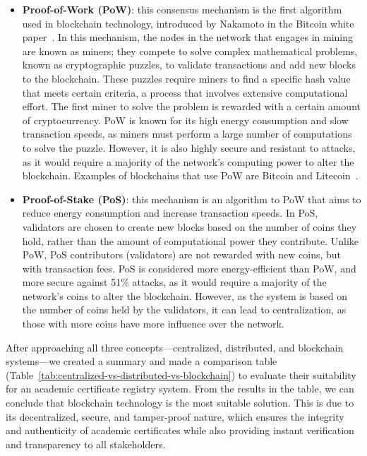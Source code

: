 \begin{itemize}
    \item \textbf{Proof-of-Work (PoW)}: this consensus mechanism is the first algorithm used in blockchain technology, introduced by Nakamoto in the Bitcoin white paper~\cite{nakamoto2008bitcoin}.
          In this mechanism, the nodes in the network that engages in mining are known as miners; they compete to solve complex mathematical problems, known as cryptographic puzzles, to validate transactions and add new blocks to the blockchain. These puzzles require miners to find a specific hash value that meets certain criteria, a process that involves extensive computational effort. The first miner to solve the problem is rewarded with a certain amount of cryptocurrency.
          PoW is known for its high energy consumption and slow transaction speeds, as miners must perform a large number of computations to solve the puzzle. However, it is also highly secure and resistant to attacks, as it would require a majority of the network's computing power to alter the blockchain.
          Examples of blockchains that use PoW are Bitcoin and Litecoin~\cite{takashima2018litecoin}.
    \item \textbf{Proof-of-Stake (PoS)}: this mechanism is an algorithm to PoW that aims to reduce energy consumption and increase transaction speeds.
          In PoS, validators are chosen to create new blocks based on the number of coins they hold, rather than the amount of computational power they contribute.
          Unlike PoW, PoS contributors (validators) are not rewarded with new coins, but with transaction fees. PoS is considered more energy-efficient than PoW, and more secure
          against 51\% attacks, as it would require a majority of the network's coins to alter the blockchain. However, as the system is based on the number of coins held by the validators, it can lead to centralization, as those with more coins have more influence over the network.
\end{itemize}

After approaching all three concepts—centralized, distributed, and blockchain systems—we created a summary and made a comparison table (Table~\ref{tab:centralized-vs-distributed-vs-blockchain}) to evaluate their suitability for an academic certificate registry system. From the results in the table, we can conclude that blockchain technology is the most suitable solution. This is due to its decentralized, secure, and tamper-proof nature, which ensures the integrity and authenticity of academic certificates while also providing instant verification and transparency to all stakeholders.

